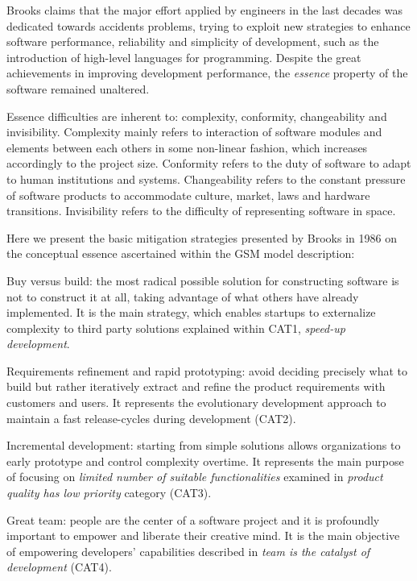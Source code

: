 \documentclass[10pt,journal,letterpaper,compsoc]{IEEEtran}
\begin{document}
Brooks claims that the major effort applied by engineers in the last decades
was dedicated towards accidents problems, trying to exploit new strategies to
enhance software performance, reliability and simplicity of development, such as
the introduction of high-level languages for programming. Despite the great
achievements in improving development performance, the \textit{essence} property
of the software remained unaltered.

Essence difficulties are inherent to: complexity, conformity, changeability and
invisibility. Complexity mainly refers to interaction of software modules and
elements between each others in some non-linear fashion, which increases
accordingly to the project size. Conformity refers to the duty of software to
adapt to human institutions and systems. Changeability refers to the constant
pressure of software products to accommodate culture, market, laws and hardware
transitions. Invisibility refers to the difficulty of representing software in
space.

Here we present the basic mitigation strategies presented by Brooks in 1986 on 
the conceptual essence ascertained within the GSM model description:


\begin{compactitem}

\item Buy versus build: the most radical possible solution for constructing
software is not to construct it at all, taking advantage of what others have
already implemented. It is the main strategy, which enables startups to
externalize complexity to third party solutions explained within CAT1, \textit
{speed-up development}. 
\item Requirements refinement and rapid prototyping: avoid deciding precisely 
what to build but rather iteratively extract and refine the product requirements 
with customers and users. It represents the evolutionary development approach to 
maintain a fast release-cycles during development (CAT2). 
\item Incremental development: starting from simple solutions allows 
organizations to early prototype and control complexity overtime. It represents 
the main purpose of focusing on \textit{limited number of suitable 
functionalities} examined in \textit{product quality has low priority} category 
(CAT3). 
\item Great team: people are the center of a software project and it is 
profoundly important to empower and liberate their creative mind. It is the main 
objective of empowering developers' capabilities described in \textit{team is 
the catalyst of development} (CAT4).
\end{compactitem}
\end{document}
